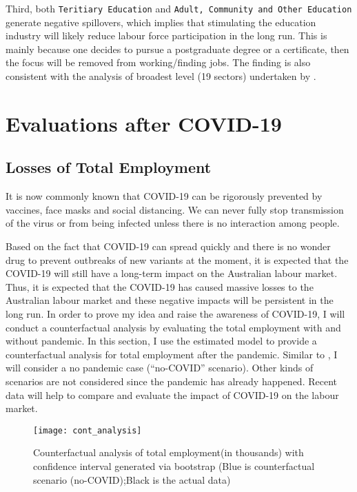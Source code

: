 \documentclass{monashthesis}
\begin{document}
Third, both \texttt{Teritiary\ Education} and \texttt{Adult,\ Community\ and\ Other\ Education} generate negative spillovers, which implies that stimulating the education industry will likely reduce labour force participation in the long run. This is mainly because one decides to pursue a postgraduate degree or a certificate, then the focus will be removed from working/finding jobs. The finding is also consistent with the analysis of broadest level (19 sectors) undertaken by \textcite{anderson2020}.

\hypertarget{evaluations-after-covid-19}{%
\section{Evaluations after COVID-19}\label{evaluations-after-covid-19}}

\hypertarget{losses-of-total-employment}{%
\subsection{Losses of Total Employment}\label{losses-of-total-employment}}

It is now commonly known that COVID-19 can be rigorously prevented by vaccines, face masks and social distancing. We can never fully stop transmission of the virus or from being infected unless there is no interaction among people.

Based on the fact that COVID-19 can spread quickly and there is no wonder drug to prevent outbreaks of new variants at the moment, it is expected that the COVID-19 will still have a long-term impact on the Australian labour market. Thus, it is expected that the COVID-19 has caused massive losses to the Australian labour market and these negative impacts will be persistent in the long run. In order to prove my idea and raise the awareness of COVID-19, I will conduct a counterfactual analysis by evaluating the total employment with and without pandemic. In this section, I use the estimated model to provide a counterfactual analysis for total employment after the pandemic. Similar to \textcite{anderson2020}, I will consider a no pandemic case (``no-COVID'' scenario). Other kinds of scenarios are not considered since the pandemic has already happened. Recent data will help to compare and evaluate the impact of COVID-19 on the labour market.

\begin{figure}[H]
\texttt{[image: cont\_analysis]}
\centering
\caption{Counterfactual analysis of total employment(in thousands) with confidence interval generated via bootstrap (Blue is counterfactual scenario (no-COVID);Black is the actual data)}
\label{fig:con}
\end{figure}
\end{document}
